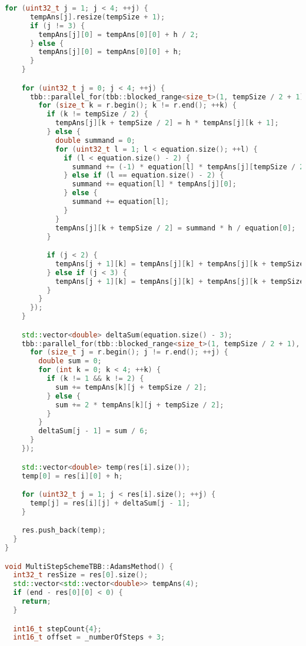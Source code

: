 \documentclass{report}
\begin{document}
\begin{lstlisting}[language=C++,caption=TBB версия]
    for (uint32_t j = 1; j < 4; ++j) {
      tempAns[j].resize(tempSize + 1);
      if (j != 3) {
        tempAns[j][0] = tempAns[0][0] + h / 2;
      } else {
        tempAns[j][0] = tempAns[0][0] + h;
      }
    }

    for (uint32_t j = 0; j < 4; ++j) {
      tbb::parallel_for(tbb::blocked_range<size_t>(1, tempSize / 2 + 1), [&](const tbb::blocked_range<size_t>& r) {
        for (size_t k = r.begin(); k != r.end(); ++k) {
          if (k != tempSize / 2) {
            tempAns[j][k + tempSize / 2] = h * tempAns[j][k + 1];
          } else {
            double summand = 0;
            for (uint32_t l = 1; l < equation.size(); ++l) {
              if (l < equation.size() - 2) {
                summand += (-1) * equation[l] * tempAns[j][tempSize / 2 - l + 1];
              } else if (l == equation.size() - 2) {
                summand += equation[l] * tempAns[j][0];
              } else {
                summand += equation[l];
              }
            }
            tempAns[j][k + tempSize / 2] = summand * h / equation[0];
          }

          if (j < 2) {
            tempAns[j + 1][k] = tempAns[j][k] + tempAns[j][k + tempSize / 2] / 2;
          } else if (j < 3) {
            tempAns[j + 1][k] = tempAns[j][k] + tempAns[j][k + tempSize / 2];
          }
        }
      });
    }

    std::vector<double> deltaSum(equation.size() - 3);
    tbb::parallel_for(tbb::blocked_range<size_t>(1, tempSize / 2 + 1), [&](const tbb::blocked_range<size_t>& r) {
      for (size_t j = r.begin(); j != r.end(); ++j) {
        double sum = 0;
        for (int k = 0; k < 4; ++k) {
          if (k != 1 && k != 2) {
            sum += tempAns[k][j + tempSize / 2];
          } else {
            sum += 2 * tempAns[k][j + tempSize / 2];
          }
        }
        deltaSum[j - 1] = sum / 6;
      }
    });

    std::vector<double> temp(res[i].size());
    temp[0] = res[i][0] + h;

    for (uint32_t j = 1; j < res[i].size(); ++j) {
      temp[j] = res[i][j] + deltaSum[j - 1];
    }

    res.push_back(temp);
  }
}

void MultiStepSchemeTBB::AdamsMethod() {
  int32_t resSize = res[0].size();
  std::vector<std::vector<double>> tempAns(4);
  if (end - res[0][0] < 0) {
    return;
  }

  int16_t stepCount{4};
  int16_t offset = _numberOfSteps + 3;


\end{lstlisting}
\end{document}
